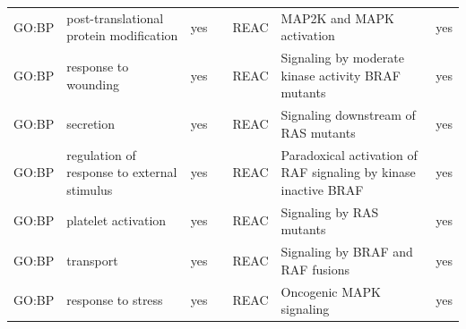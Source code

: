 \begin{longtable}{@{}lp{5cm}lllp{5cm}l@{}}
GO:BP           & post-translational protein modification                                                                                            & yes              &           & REAC            & MAP2K and MAPK activation                                                                                                                                              & yes              \\
GO:BP           & response to wounding                                                                                                               & yes              &           & REAC            & Signaling by moderate kinase activity BRAF mutants                                                                                                                     & yes              \\
GO:BP           & secretion                                                                                                                          & yes              &           & REAC            & Signaling downstream of RAS mutants                                                                                                                                    & yes              \\
GO:BP           & regulation of response to external stimulus                                                                                        & yes              &           & REAC            & Paradoxical activation of RAF signaling by kinase inactive BRAF                                                                                                        & yes              \\
GO:BP           & platelet activation                                                                                                                & yes              &           & REAC            & Signaling by RAS mutants                                                                                                                                               & yes              \\
GO:BP           & transport                                                                                                                          & yes              &           & REAC            & Signaling by BRAF and RAF fusions                                                                                                                                      & yes              \\
GO:BP           & response to stress                                                                                                                 & yes              &           & REAC            & Oncogenic MAPK signaling                                                                                                                                               & yes              \\

\end{longtable}
